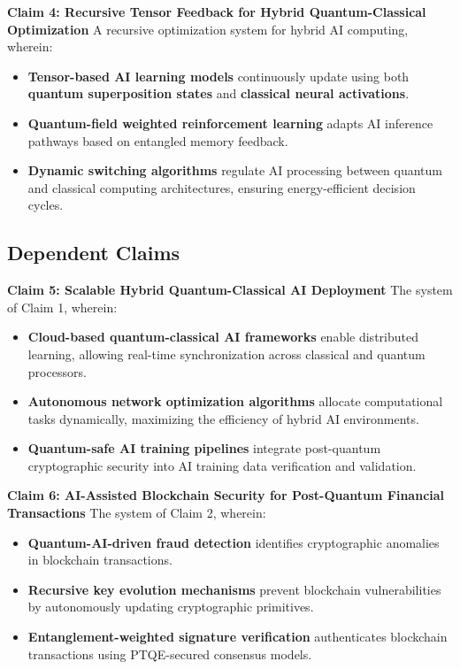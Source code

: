 \documentclass{article}
\theoremstyle{plain}
\begin{document}
\noindent \textbf{Claim 4: Recursive Tensor Feedback for Hybrid Quantum-Classical Optimization}  
A recursive optimization system for hybrid AI computing, wherein:

\begin{itemize}
    \item \textbf{Tensor-based AI learning models} continuously update using both \textbf{quantum superposition states} and \textbf{classical neural activations}.
    \item \textbf{Quantum-field weighted reinforcement learning} adapts AI inference pathways based on entangled memory feedback.
    \item \textbf{Dynamic switching algorithms} regulate AI processing between quantum and classical computing architectures, ensuring energy-efficient decision cycles.
\end{itemize}

\subsection{Dependent Claims}

\noindent \textbf{Claim 5: Scalable Hybrid Quantum-Classical AI Deployment}  
The system of Claim 1, wherein:

\begin{itemize}
    \item \textbf{Cloud-based quantum-classical AI frameworks} enable distributed learning, allowing real-time synchronization across classical and quantum processors.
    \item \textbf{Autonomous network optimization algorithms} allocate computational tasks dynamically, maximizing the efficiency of hybrid AI environments.
    \item \textbf{Quantum-safe AI training pipelines} integrate post-quantum cryptographic security into AI training data verification and validation.
\end{itemize}

\noindent \textbf{Claim 6: AI-Assisted Blockchain Security for Post-Quantum Financial Transactions}  
The system of Claim 2, wherein:

\begin{itemize}
    \item \textbf{Quantum-AI-driven fraud detection} identifies cryptographic anomalies in blockchain transactions.
    \item \textbf{Recursive key evolution mechanisms} prevent blockchain vulnerabilities by autonomously updating cryptographic primitives.
    \item \textbf{Entanglement-weighted signature verification} authenticates blockchain transactions using PTQE-secured consensus models.
\end{itemize}
\end{document}
